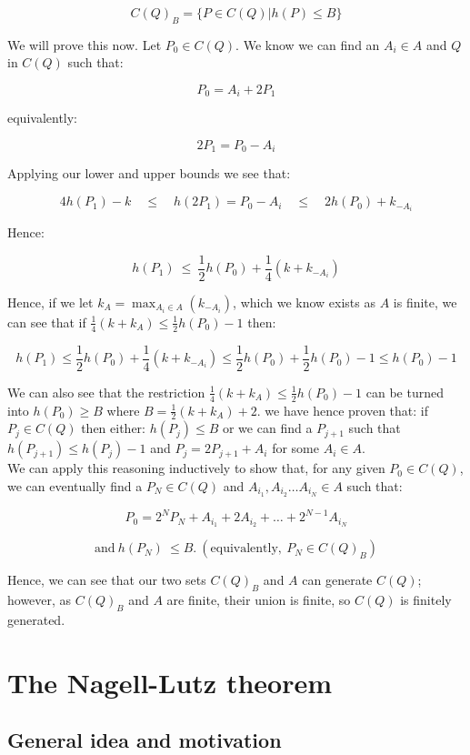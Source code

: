 \documentclass{article}
\begin{document}
\[ C(Q)_B = \{P \in C(Q) | h(P) \leq B\} \]

We will prove this now. Let $P_0 \in C(Q)$. We know we can find an $A_i \in A$ and $Q$ in $C(Q)$ such that:

\[P_0 = A_i + 2P_1 \]

equivalently:

\[ 2P_1 = P_0 - A_i \]

Applying our lower and upper bounds we see that:

\[ 4h(P_1) - k \quad \leq \quad  h(2P_1) =  P_0 - A_i  \quad  \leq  \quad  2h(P_0) + k_{-A_i} \]

Hence:

\[ h(P_1) \ \leq \ \frac{1}{2}h(P_0) + \frac{1}{4} (k + k_{-A_i}) \]

Hence, if we let $k_A = \max_{A_i \in A}(k_{-A_i})$, which we know exists as $A$ is finite, we can see that if $\frac{1}{4}(k + k_A) \leq \frac{1}{2}h(P_0) - 1$ then:

\[ h(P_1) \leq \frac{1}{2}h(P_0) + \frac{1}{4} (k + k_{-A_i}) \leq \frac{1}{2}h(P_0) + \frac{1}{2}h(P_0) - 1 \leq h(P_0) - 1 \]

We can also see that the restriction $\frac{1}{4}(k + k_A) \leq \frac{1}{2}h(P_0) - 1$ can be turned into $h(P_0) \geq B$ where $B = \frac{1}{2}(k + k_A) + 2$. we have hence proven that: if $P_j \in C(Q)$ then either: $h(P_j) \leq B$ or we can find a $P_{j + 1}$ such that $h(P_{j + 1}) \leq h(P_j) - 1$ and $P_j = 2P_{j+1} + A_i$ for some $A_i \in A$.\\

We can apply this reasoning inductively to show that, for any given $P_0 \in C(Q)$, we can eventually find a $P_N \in C(Q)$ and $A_{i_1}, A_{i_2} \dots A_{i_N} \in A$ such that:

\[ P_0 = 2^N P_N + A_{i_1} + 2 A_{i_2} + \dots + 2^{N-1}A_{i_N} \]

\[ \text{and} \ h(P_N) \ \leq B. \ (\text{equivalently}, \ P_N \in C(Q)_B) \]

Hence, we can see that our two sets $C(Q)_B$ and $A$ can generate $C(Q)$; however, as $C(Q)_B$ and $A$ are finite, their union is finite, so $C(Q)$ is finitely generated.


\newpage

\section{The Nagell-Lutz theorem}

\subsection{General idea and motivation}
\end{document}
